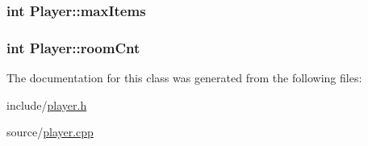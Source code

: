 \subsubsection[{\texorpdfstring{max\+Items}{maxItems}}]{\setlength{\rightskip}{0pt plus 5cm}int Player\+::max\+Items\hspace{0.3cm}{\ttfamily [private]}}\hypertarget{class_player_a903fd9a9a0dd63ddf7e88b901a72fb99}{}\label{class_player_a903fd9a9a0dd63ddf7e88b901a72fb99}
\subsubsection[{\texorpdfstring{room\+Cnt}{roomCnt}}]{\setlength{\rightskip}{0pt plus 5cm}int Player\+::room\+Cnt\hspace{0.3cm}{\ttfamily [private]}}\hypertarget{class_player_a5de846054e4705449a8b8a2365f2f86c}{}\label{class_player_a5de846054e4705449a8b8a2365f2f86c}


The documentation for this class was generated from the following files\+:\begin{DoxyCompactItemize}
\item 
include/\hyperlink{player_8h}{player.\+h}\item 
source/\hyperlink{player_8cpp}{player.\+cpp}\end{DoxyCompactItemize}
